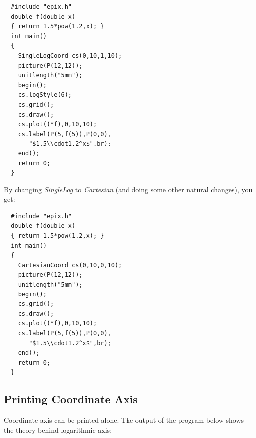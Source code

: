 \documentclass[12pt,a4paper]{article}
\begin{document}

  \begin{minipage}{7.5cm}
    \begin{lstlisting}
  #include "epix.h"
  double f(double x)
  { return 1.5*pow(1.2,x); }
  int main()
  {
    SingleLogCoord cs(0,10,1,10);
    picture(P(12,12));
    unitlength("5mm");
    begin();
    cs.logStyle(6);
    cs.grid();
    cs.draw();
    cs.plot((*f),0,10,10);
    cs.label(P(5,f(5)),P(0,0),
       "$1.5\\cdot1.2^x$",br);
    end();
    return 0;
  }
    \end{lstlisting}
  \end{minipage}
  \begin{minipage}{5.5cm}
    
  \end{minipage}

  By changing \textit{SingleLog} to \textit{Cartesian} (and doing some other natural
  changes), you get:

  \begin{minipage}{7.5cm}
    \begin{lstlisting}
  #include "epix.h"
  double f(double x)
  { return 1.5*pow(1.2,x); }
  int main()
  {
    CartesianCoord cs(0,10,0,10);
    picture(P(12,12));
    unitlength("5mm");
    begin();
    cs.grid();
    cs.draw();
    cs.plot((*f),0,10,10);
    cs.label(P(5,f(5)),P(0,0),
       "$1.5\\cdot1.2^x$",br);
    end();
    return 0;
  }
    \end{lstlisting}
  \end{minipage}
  \begin{minipage}{5.5cm}
    
  \end{minipage}


  \subsection{Printing Coordinate Axis}

  Coordinate axis can be printed alone. The output of the program below shows
  the theory behind logarithmic axis:
\end{document}
